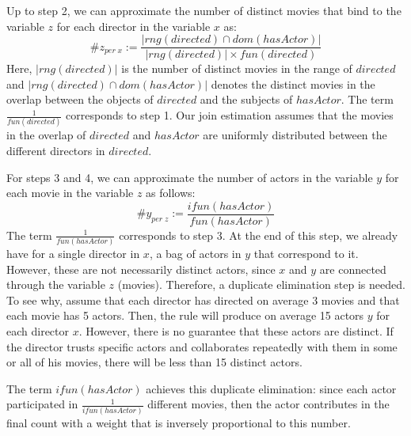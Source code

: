 {Up to step 2, we can approximate the number of distinct movies that bind to the variable $z$ for each director in the variable $x$ as:
$$
\#z_{per \; x} := \frac{|rng(directed) \cap dom(hasActor)|}{|rng(directed)| \times fun(directed)}
$$
Here, $|rng(directed)|$ is the number of distinct movies in the range of $directed$ and $|rng(directed) \cap dom(hasActor)|$ 
denotes the distinct movies in the overlap between the objects of $directed$ and the subjects of $hasActor$.
The term $\frac{1}{fun(directed)}$ corresponds to step  1.
Our join estimation assumes that the movies in the overlap of $directed$ 
and $hasActor$ are uniformly distributed between the different directors in $directed$.

For steps 3 and 4, we can approximate the number of actors in the variable $y$ for each movie in the variable $z$ as follows:
$$
\#y_{ per \; z} := \frac{ifun(hasActor)}{fun(hasActor)}
$$
The term $\frac{1}{fun(hasActor)}$ corresponds to step 3. At the end of this step, 
we already have for a single director in $x$, a bag of actors in $y$ that correspond to it.
However, these are not necessarily distinct actors, since $x$ and $y$ are connected through the variable $z$ (movies). Therefore, a duplicate elimination step is needed.
To see why, assume that each director has directed on average 3 movies and that each movie has 5 actors. Then, the rule will produce on average 15 actors $y$ for each director $x$.
However, there is no guarantee that these actors are distinct.
If the director trusts specific actors and collaborates repeatedly with them in some or all of his movies, there will be less than 15 distinct actors.



The term $ifun(hasActor)$ achieves this duplicate elimination: 
since each actor participated in $\frac{1}{ifun(hasActor)}$ different movies, then the actor
contributes in the final count with a weight that is inversely proportional to this number.


}
